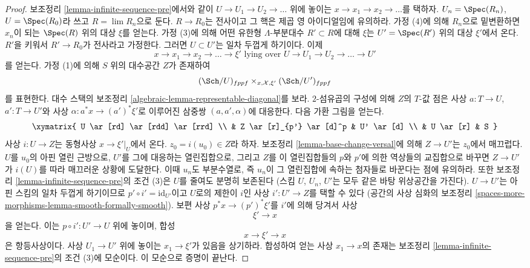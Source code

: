 \begin{proof}
\medskip\noindent
보조정리 \ref{lemma-infinite-sequence-pre}에서와 같이
$U \to U_1 \to U_2 \to \ldots$ 위에 놓이는
$x \to x_1 \to x_2 \to \ldots$를 택하자.
$U_n = \Spec(R_n)$, $U = \Spec(R_0)$라 쓰고 $R = \lim R_n$으로 둔다.
$R \to R_0$는 전사이고 그 핵은 제곱 영 아이디얼임에 유의하라.
가정 (4)에 의해 $R_n$으로 밑변환하면 $x_n$이 되는
$\Spec(R)$ 위의 대상 $\xi$를 얻는다.
가정 (3)에 의해 어떤 유한형 $\Lambda$-부분대수 $R' \subset R$에 대해
$\xi$는 $U' = \Spec(R')$ 위의 대상 $\xi'$에서 온다.
$R'$을 키워서 $R' \to R_0$가 전사라고 가정한다.
그러면 $U \subset U'$는 일차 두껍게 하기이다. 이제
$$
x \to x_1 \to x_2 \to \ldots \to \xi'
\text{ lying over }
U \to U_1 \to U_2 \to \ldots \to U'
$$
를 얻는다. 가정 (1)에 의해 $S$ 위의 대수공간 $Z$가 존재하여
$$
(\Sch/U)_{fppf} \times_{x, \mathcal{X}, \xi'} (\Sch/U')_{fppf}
$$
를 표현한다. 대수 스택의 보조정리
\ref{algebraic-lemma-representable-diagonal}를 보라.
$2$-섬유곱의 구성에 의해 $Z$의 $T$-값 점은 사상 $a : T \to U$,
$a' : T \to U'$와 사상 $\alpha : a^*x \to (a')^*\xi'$로 이루어진
삼중쌍 $(a, a', \alpha)$에 대응한다. 다음 가환 그림을 얻는다.
$$
\xymatrix{
U \ar[rd] \ar[rdd] \ar[rrd] \\
& Z \ar[r]_{p'} \ar[d]^p & U' \ar[d] \\
& U \ar[r] & S
}
$$
사상 $i : U \to Z$는 동형사상 $x \to \xi'|_U$에서 온다.
$z_0 = i(u_0) \in Z$라 하자. 보조정리 \ref{lemma-base-change-versal}에
의해 $Z \to U'$는 $z_0$에서 매끄럽다.
$U$를 $u_0$의 아핀 열린 근방으로, $U'$를 그에 대응하는 열린집합으로,
그리고 $Z$를 이 열린집합들의 $p$와 $p'$에 의한 역상들의 교집합으로
바꾸면 $Z \to U'$가 $i(U)$를 따라 매끄러운 상황에 도달한다.
이때 $u_n$도 부분수열로, 즉 $u_n$이 그 열린집합에 속하는 첨자들로
바꾼다는 점에 유의하라. 또한 보조정리 \ref{lemma-infinite-sequence-pre}의
조건 (3)은 $U$를 줄여도 분명히 보존된다
(스킴 $U$, $U_n$, $U'$는 모두 같은 바탕 위상공간을 가진다).
$U \to U'$는 아핀 스킴의 일차 두껍게 하기이므로
$p' \circ i' = \text{id}_{U'}$이고 $U$로의 제한이 $i$인 사상
$i' : U' \to Z$를 택할 수 있다
(공간의 사상 심화의 보조정리
\ref{spaces-more-morphisms-lemma-smooth-formally-smooth}).
보편 사상 $p^*x \to (p')^*\xi'$를 $i'$에 의해 당겨서 사상
$$
\xi' \to x
$$
을 얻는다. 이는 $p \circ i' : U' \to U$ 위에 놓이며, 합성
$$
x \to \xi' \to x
$$
은 항등사상이다. 사상 $U_1 \to U'$ 위에 놓이는 $x_1 \to \xi'$가
있음을 상기하라. 합성하여 얻는 사상 $x_1 \to x$의 존재는
보조정리 \ref{lemma-infinite-sequence-pre}의 조건 (3)에 모순이다.
이 모순으로 증명이 끝난다.
\end{proof}

